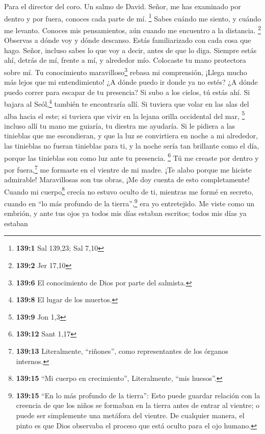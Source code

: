 Para el director del coro. Un salmo de David.  Señor, me
has examinado por dentro y por fuera, conoces cada parte de mí.
\footnote{\textbf{139:1} Sal 139,23; Sal 7,10}  Sabes
cuándo me siento, y cuándo me levanto. Conoces mis pensamientos, aún
cuando me encuentro a la distancia. \footnote{\textbf{139:2} Jer 17,10}
 Observas a dónde voy y dónde descanso. Estás
familiarizado con cada cosa que hago.  Señor, incluso
sabes lo que voy a decir, antes de que lo diga.  Siempre
estás ahí, detrás de mí, frente a mí, y alrededor mío. Colocaste tu mano
protectora sobre mí.  Tu conocimiento
maravilloso\footnote{\textbf{139:6} El conocimiento de Dios por parte
  del salmista.} rebasa mi comprensión, ¡Llega mucho más lejos que mi
entendimiento!  ¿A dónde puedo ir donde ya no estés? ¿A
dónde puedo correr para escapar de tu presencia?  Si subo
a los cielos, tú estás ahí. Si bajara al Seól,\footnote{\textbf{139:8}
  El lugar de los muertos.} también te encontraría allí. 
Si tuviera que volar en las alas del alba hacia el este; si tuviera que
vivir en la lejana orilla occidental del mar, \footnote{\textbf{139:9}
  Jon 1,3}  incluso allí tu mano me guiaría, tu diestra
me ayudaría.  Si le pidiera a las tinieblas que me
escondieran, y que la luz se convirtiera en noche a mi alrededor,
 las tinieblas no fueran tinieblas para ti, y la noche
sería tan brillante como el día, porque las tinieblas son como luz ante
tu presencia. \footnote{\textbf{139:12} Sant 1,17}  Tú me
creaste por dentro y por fuera,\footnote{\textbf{139:13} Literalmente,
  ``riñones'', como representantes de los órganos internos.} me formaste
en el vientre de mi madre.  ¡Te alabo porque me hiciste
admirable! Maravillosas son tus obras, ¡Me doy cuenta de esto
completamente!  Cuando mi cuerpo\footnote{\textbf{139:15}
  ``Mi cuerpo en crecimiento'', Literalmente, ``mis huesos''.} crecía no
estuvo oculto de ti, mientras me formé en secreto, cuando en ``lo más
profundo de la tierra'',\footnote{\textbf{139:15} ``En lo más profundo
  de la tierra'': Esto puede guardar relación con la creencia de que los
  niños se formaban en la tierra antes de entrar al vientre; o puede ser
  simplemente una metáfora del vientre. De cualquier manera, el pinto es
  que Dios observaba el proceso que está oculto para el ojo humano.} era
yo entretejido.  Me viste como un embrión, y ante tus
ojos ya todos mis días estaban escritos; todos mis días ya estaban
